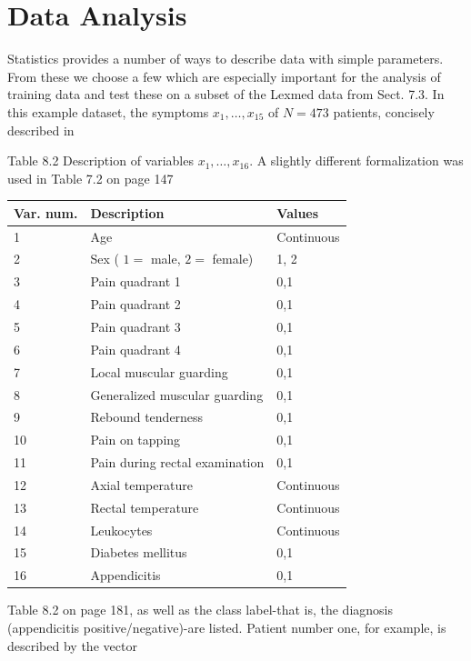 \documentclass[10pt]{book}
\begin{document}
\section{Data Analysis}
Statistics provides a number of ways to describe data with simple parameters. From these we choose a few which are especially important for the analysis of training data and test these on a subset of the Lexmed data from Sect. 7.3. In this example dataset, the symptoms $x_{1}, \ldots, x_{15}$ of $N=473$ patients, concisely described in

Table 8.2 Description of variables $x_{1}, \ldots, x_{16}$. A slightly different formalization was used in Table 7.2 on page 147


\begin{center}
\begin{tabular}{|l|l|l|}
\hline
Var. num. & Description & Values \\
\hline
1 & Age & Continuous \\
\hline
2 & Sex ( $1=$ male, $2=$ female) & 1, 2 \\
\hline
3 & Pain quadrant 1 & 0,1 \\
\hline
4 & Pain quadrant 2 & 0,1 \\
\hline
5 & Pain quadrant 3 & 0,1 \\
\hline
6 & Pain quadrant 4 & 0,1 \\
\hline
7 & Local muscular guarding & 0,1 \\
\hline
8 & Generalized muscular guarding & 0,1 \\
\hline
9 & Rebound tenderness & 0,1 \\
\hline
10 & Pain on tapping & 0,1 \\
\hline
11 & Pain during rectal examination & 0,1 \\
\hline
12 & Axial temperature & Continuous \\
\hline
13 & Rectal temperature & Continuous \\
\hline
14 & Leukocytes & Continuous \\
\hline
15 & Diabetes mellitus & 0,1 \\
\hline
16 & Appendicitis & 0,1 \\

\hline
\end{tabular}
\end{center}

Table 8.2 on page 181, as well as the class label-that is, the diagnosis (appendicitis positive/negative)-are listed. Patient number one, for example, is described by the vector
\end{document}
